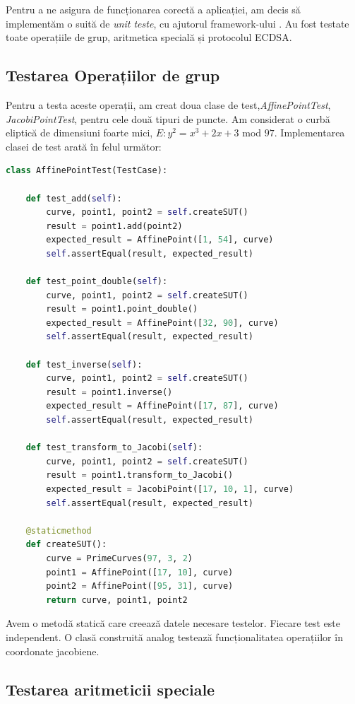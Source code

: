 Pentru a ne asigura de funcționarea corectă a aplicației, am decis să implementăm o suită de \textit{unit teste}, cu ajutorul framework-ului \cite{unit}. Au fost testate toate operațiile de grup, aritmetica specială și protocolul ECDSA.

\subsection{Testarea Operațiilor de grup}
Pentru a testa aceste operații, am creat doua clase de test,\textit{AffinePointTest}, \textit{JacobiPointTest}, pentru cele două tipuri de puncte. Am considerat o curbă eliptică de dimensiuni foarte mici, $E: y^2 = x^3 + 2x + 3$ mod $97$. Implementarea clasei de test arată în felul următor:

\begin{lstlisting}[language=Python]
class AffinePointTest(TestCase):

    def test_add(self):
        curve, point1, point2 = self.createSUT()
        result = point1.add(point2)
        expected_result = AffinePoint([1, 54], curve)
        self.assertEqual(result, expected_result)

    def test_point_double(self):
        curve, point1, point2 = self.createSUT()
        result = point1.point_double()
        expected_result = AffinePoint([32, 90], curve)
        self.assertEqual(result, expected_result)

    def test_inverse(self):
        curve, point1, point2 = self.createSUT()
        result = point1.inverse()
        expected_result = AffinePoint([17, 87], curve)
        self.assertEqual(result, expected_result)

    def test_transform_to_Jacobi(self):
        curve, point1, point2 = self.createSUT()
        result = point1.transform_to_Jacobi()
        expected_result = JacobiPoint([17, 10, 1], curve)
        self.assertEqual(result, expected_result)

    @staticmethod
    def createSUT():
        curve = PrimeCurves(97, 3, 2)
        point1 = AffinePoint([17, 10], curve)
        point2 = AffinePoint([95, 31], curve)
        return curve, point1, point2
\end{lstlisting}

Avem o metodă statică care creează datele necesare testelor. Fiecare test este independent. O clasă construită analog testează funcționalitatea operațiilor în coordonate jacobiene.

\subsection{Testarea aritmeticii speciale}

